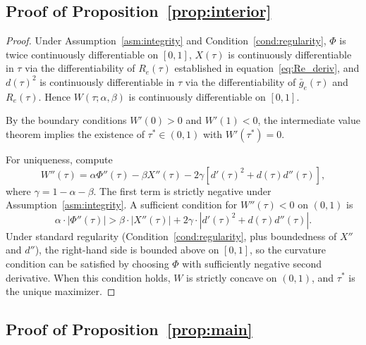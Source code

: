 \subsection{Proof of Proposition~\ref{prop:interior}}
\label{ssec:proof_interior}

\begin{proof}
Under Assumption~\ref{asm:integrity} and Condition~\ref{cond:regularity}, $\Phi$ is twice continuously differentiable on $[0, 1]$, $X(\tau)$ is continuously differentiable in $\tau$ via the differentiability of $R_e(\tau)$ established in equation~\eqref{eq:Re_deriv}, and $d(\tau)^2$ is continuously differentiable in $\tau$ via the differentiability of $\bar g_e(\tau)$ and $R_e(\tau)$. Hence $W(\tau; \alpha, \beta)$ is continuously differentiable on $[0, 1]$.

By the boundary conditions $W'(0) > 0$ and $W'(1) < 0$, the intermediate value theorem implies the existence of $\tau^* \in (0, 1)$ with $W'(\tau^*) = 0$.

For uniqueness, compute
\begin{equation}
W''(\tau) = \alpha \Phi''(\tau) - \beta X''(\tau) - 2\gamma [d'(\tau)^2 + d(\tau) d''(\tau)],
\label{eq:Wpp}
\end{equation}
where $\gamma = 1 - \alpha - \beta$. The first term is strictly negative under Assumption~\ref{asm:integrity}. A sufficient condition for $W''(\tau) < 0$ on $(0, 1)$ is
\[
\alpha \cdot |\Phi''(\tau)| > \beta \cdot |X''(\tau)| + 2\gamma \cdot |d'(\tau)^2 + d(\tau) d''(\tau)|.
\]
Under standard regularity (Condition~\ref{cond:regularity}, plus boundedness of $X''$ and $d''$), the right-hand side is bounded above on $[0, 1]$, so the curvature condition can be satisfied by choosing $\Phi$ with sufficiently negative second derivative. When this condition holds, $W$ is strictly concave on $(0, 1)$, and $\tau^*$ is the unique maximizer.
\end{proof}

\subsection{Proof of Proposition~\ref{prop:main}}
\label{ssec:proof_main}

